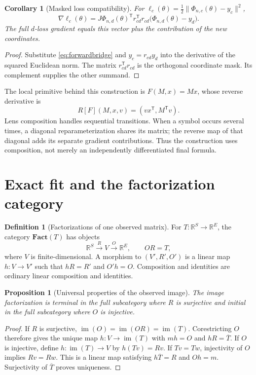 \documentclass[11pt]{article}
\newtheorem{proposition}[theorem]{Proposition}
\newtheorem{corollary}[theorem]{Corollary}
\theoremstyle{definition}
\newtheorem{definition}[theorem]{Definition}
\newcommand{\R}{\mathbb R}
\newcommand{\im}{\operatorname{im}}
\newcommand{\Fact}{\mathbf{Fact}}
\begin{document}
\begin{corollary}[Masked loss compatibility]\label{cor:masked}
For $\ell_c(\theta)=\tfrac12\|\Phi_{n,c}(\theta)-y_c\|^2$,
\[
\nabla\ell_c(\theta)=J\Phi_{n,d}(\theta)^{\mathsf T}
r_{cd}^{\mathsf T}r_{cd}\bigl(\Phi_{n,d}(\theta)-y_d\bigr).
\]
The full $d$-loss gradient equals this vector plus the contribution of the
new coordinates.
\end{corollary}
\begin{proof}
Substitute \eqref{eq:forwardbridge} and $y_c=r_{cd}y_d$ into the derivative of
the squared Euclidean norm. The matrix $r_{cd}^{\mathsf T}r_{cd}$ is the
orthogonal coordinate mask. Its complement supplies the other summand.
\end{proof}

The local primitive behind this construction is
$F(M,x)=Mx$, whose reverse derivative is
\[
R[F](M,x,v)=(vx^{\mathsf T},M^{\mathsf T}v).
\]
Lens composition handles sequential transitions. When a symbol occurs several
times, a diagonal reparameterization shares its matrix; the reverse map of
that diagonal adds its separate gradient contributions. Thus the construction
uses composition, not merely an independently differentiated final formula.

\section{Exact fit and the factorization category}

\begin{definition}[Factorizations of one observed matrix]
For $T:\R^S\to\R^E$, the category $\Fact(T)$ has objects
\[
\R^S\xrightarrow{R}V\xrightarrow{O}\R^E,
\qquad OR=T,
\]
where $V$ is finite-dimensional. A morphism to $(V',R',O')$ is a linear map
$h:V\to V'$ such that $hR=R'$ and $O'h=O$. Composition and identities are
ordinary linear composition and identities.
\end{definition}

\begin{proposition}[Universal properties of the observed image]\label{prop:universal}
The image factorization is terminal in the full subcategory where $R$ is
surjective and initial in the full subcategory where $O$ is injective.
\end{proposition}
\begin{proof}
If $R$ is surjective, $\im(O)=\im(OR)=\im(T)$. Corestricting $O$ therefore
gives the unique map $h:V\to\im(T)$ with $mh=O$ and
$hR=\overline T$. If $O$ is injective, define
$h:\im(T)\to V$ by $h(Tv)=Rv$. If $Tv=Tw$, injectivity of $O$ implies
$Rv=Rw$. This is a linear map satisfying $h\overline T=R$ and $Oh=m$.
Surjectivity of $\overline T$ proves uniqueness.
\end{proof}
\end{document}
